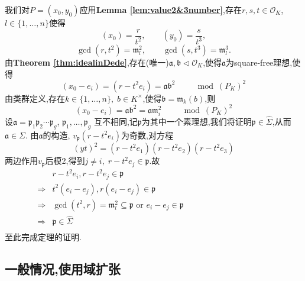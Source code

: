 \documentclass[12pt,A4paper,oneside,reqno]{amsart}
\numberwithin{equation}{section}
\theoremstyle{definition}
\theoremstyle{plain}
\theoremstyle{plain}
\numberwithin{equation}{section}
\theoremstyle{remark}
\begin{document}
我们对$P=(x_0,y_0)$应用\textbf{Lemma \ref{lem:value2&3number}},存在$r,s,t \in \mathcal{O}_K$, $l \in \{1,\ldots,n\}$使得
$$(x_0)=\frac{r}{t^2}, \qquad (y_0)=\frac{s}{t^3}, $$
$$\gcd(r,t^2)=\mathfrak{m}_l^2, \qquad \gcd (s,t^3)=\mathfrak{m}_l^3.$$
由\textbf{Theorem \ref{thm:idealinDede}},存在(唯一)$\mathfrak{a},\mathfrak{b} \vartriangleleft \mathcal{O}_K$,使得$\mathfrak{a}$为square-free理想,使得
$$(x_0-e_i)=(r-t^2e_i)=\mathfrak{a}\mathfrak{b}^2 \qquad \mod (P_K)^2$$
由类群定义,存在$k \in \{1,\ldots,n\},\; b \in K^{\times}$,使得$\mathfrak{b}=\mathfrak{m}_k(b)$,则
$$(x_0-e_i)=\mathfrak{a}\mathfrak{b}^2=\mathfrak{a}\mathfrak{m}_i^2 \qquad \mod (P_K)^2$$
设$\mathfrak{a}=\mathfrak{p}_1\mathfrak{p}_2\cdots \mathfrak{p}_g$, $\mathfrak{p}_1,\ldots ,\mathfrak{p}_g$ 互不相同,记$\mathfrak{p}$为其中一个素理想,我们将证明$\mathfrak{p} \in \hat{\Sigma}$,从而$\mathfrak{a} \in \Sigma$. 由$\mathfrak{a}$的构造, $v_{\mathfrak{p}}(r-t^2e_i)$为奇数,对方程
$$(yt)^2=(r-t^2e_1)(r-t^2e_2)(r-t^2e_3)$$
两边作用$v_{\mathfrak{p}}$后模2,得到$j \neq i,\; r-t^2e_j \in \mathfrak{p}$.故
\begin{equation*}
\begin{aligned}
& r-t^2e_i, r-t^2e_j \in \mathfrak{p}\\
\Longrightarrow& t^2(e_i-e_j),r(e_i-e_j) \in \mathfrak{p}\\
\Longrightarrow& \gcd (t^2,r)=\mathfrak{m}_l^2\subseteq\mathfrak{p} \text{ or } e_i-e_j \in \mathfrak{p}\\
\Longrightarrow&\mathfrak{p} \in \hat{\Sigma}\hspace{10cm}\\
\end{aligned}
\end{equation*}
至此完成定理的证明.
\subsection{一般情况,使用域扩张}\phantom{1}
\end{document}
